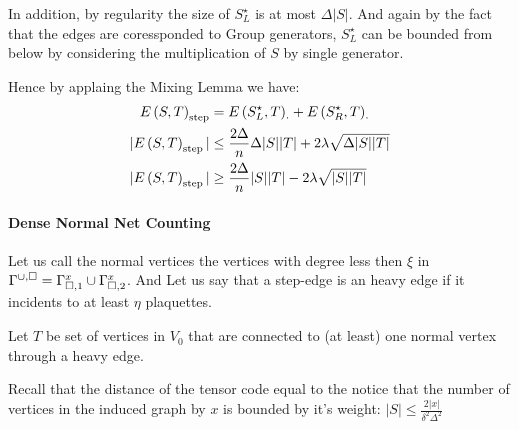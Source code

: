 \documentclass{article}
\begin{document}
\begin{multicols*}{2}
	In addition, by regularity the size of $S^{\star}_{L}$ is at most $\Delta|S|$.
	And again by the fact that the edges are coressponded to Group generators, $S^{\star}_{L}$ can be bounded from below by considering the multiplication of $S$ by single generator.    
	

	Hence by applaing the Mixing Lemma we have: 
		\begin{equation*}
	  \begin{split}
	    E\left( S,T \right)_{\text{step}} &= E\left( S^{\star}_{L}, T  \right)_{\cdot} +  E\left( S^{\star}_{R}, T  \right)_{\cdot} \\
	|E\left( S,T \right)_{\text{step}}| &\le \frac{2\Delta}{n}\Delta|S||T| + 2\lambda\sqrt{\Delta|S||T|} \\ 
      |E\left( S,T \right)_{\text{step}}| &\ge \frac{2\Delta}{n}|S||T| - 2\lambda\sqrt{|S||T|}  
	  \end{split}
	\end{equation*}



\paragraph{Dense Normal Net Counting} Let us call the normal vertices the vertices with degree less then $\xi$ in $\Gamma^{\cup, \square} = \Gamma_{\square, 1}^{x} \cup \Gamma_{\square, 2}^{x}$. 
And Let us say that a step-edge is an heavy edge if it incidents to at least $\eta$ plaquettes.

Let $ T$ be set of vertices in $V_0$ that are connected to (at least) one normal vertex through a heavy edge.  

    Recall that the distance of the tensor code equal to the   notice that the number of vertices in the induced graph by $x$ is bounded by it's weight:
    $ |S| \le \frac{2|x|}{ \delta^{2}\Delta^{2} }$ 


\end{multicols*}
\end{document}
